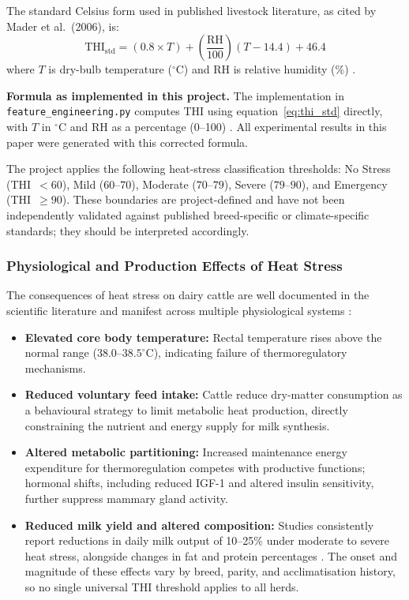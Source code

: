 \documentclass[conference]{IEEEtran}
\begin{document}
	The standard Celsius form used in published livestock literature, as cited by Mader et al.\ (2006), is:
	\begin{equation}
		\text{THI}_{\text{std}} = (0.8 \times T) + \left(\frac{\text{RH}}{100}\right)(T - 14.4) + 46.4
		\label{eq:thi_std}
	\end{equation}
	where $T$ is dry-bulb temperature ($^\circ$C) and $\text{RH}$ is relative humidity (\%) \cite{ref16}.

	\textbf{Formula as implemented in this project.}
	The implementation in \texttt{feature\_engineering.py} computes THI using equation~\eqref{eq:thi_std} directly, with $T$ in $^\circ$C and $\text{RH}$ as a percentage (0--100) \cite{ref16}. All experimental results in this paper were generated with this corrected formula.

	The project applies the following heat-stress classification thresholds: No Stress (THI~$< 60$), Mild ($60$--$70$), Moderate ($70$--$79$), Severe ($79$--$90$), and Emergency (THI~$\geq 90$). These boundaries are project-defined and have not been independently validated against published breed-specific or climate-specific standards; they should be interpreted accordingly.

	\subsubsection{Physiological and Production Effects of Heat Stress}
	The consequences of heat stress on dairy cattle are well documented in the scientific literature and manifest across multiple physiological systems \cite{ref15}:
	\begin{itemize}
		\item \textbf{Elevated core body temperature:} Rectal temperature rises above the normal range ($38.0$--$38.5^\circ$C), indicating failure of thermoregulatory mechanisms.
		\item \textbf{Reduced voluntary feed intake:} Cattle reduce dry-matter consumption as a behavioural strategy to limit metabolic heat production, directly constraining the nutrient and energy supply for milk synthesis.
		\item \textbf{Altered metabolic partitioning:} Increased maintenance energy expenditure for thermoregulation competes with productive functions; hormonal shifts, including reduced IGF-1 and altered insulin sensitivity, further suppress mammary gland activity.
		\item \textbf{Reduced milk yield and altered composition:} Studies consistently report reductions in daily milk output of 10--25\% under moderate to severe heat stress, alongside changes in fat and protein percentages \cite{ref15}. The onset and magnitude of these effects vary by breed, parity, and acclimatisation history, so no single universal THI threshold applies to all herds.
	\end{itemize}
\end{document}
